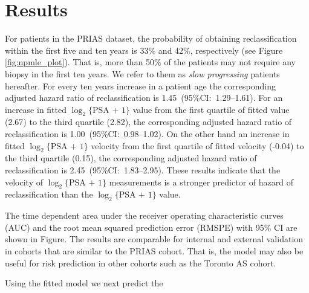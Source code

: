 \section{Results}
For patients in the PRIAS dataset, the probability of obtaining reclassification within the first five and ten years is 33\% and 42\%, respectively (see Figure \ref{fig:npmle_plot}). That is, more than 50\% of the patients may not require any biopsy in the first ten years. We refer to them as \textit{slow progressing} patients hereafter. For every ten years increase in a patient age the corresponding adjusted hazard ratio of reclassification is 1.45~(95\%CI:~1.29--1.61). For an increase in fitted $\log_2\{\mbox{PSA + 1}\}$ value from the first quartile of fitted value (2.67) to the third quartile (2.82), the corresponding adjusted hazard ratio of reclassification is 1.00~(95\%CI:~0.98--1.02). On the other hand an increase in fitted $\log_2\{\mbox{PSA + 1}\}$ velocity from the first quartile of fitted velocity (-0.04) to the third quartile (0.15), the corresponding adjusted hazard ratio of reclassification is 2.45~(95\%CI:~1.83--2.95). These results indicate that the velocity of $\log_2\{\mbox{PSA + 1}\}$ measurements is a stronger predictor of hazard of reclassification than the $\log_2\{\mbox{PSA + 1}\}$ value.

The time dependent area under the receiver operating characteristic curves (AUC) and the root mean squared prediction error (RMSPE) with 95\% CI are shown in Figure. The results are comparable for internal and external validation in cohorts that are similar to the PRIAS cohort. That is, the model may also be useful for risk prediction in other cohorts such as the Toronto AS cohort. 

Using the fitted model we next predict the 

